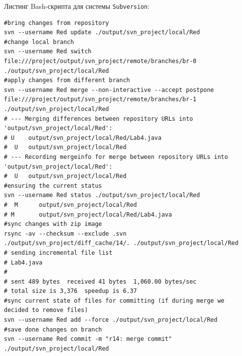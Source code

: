Листинг Bash-скрипта для системы \texttt{Subversion}:
\begin{lstlisting}
#bring changes from repository
svn --username Red update ./output/svn_project/local/Red
#change local branch
svn --username Red switch file:///project/output/svn_project/remote/branches/br-0 ./output/svn_project/local/Red
#apply changes from different branch
svn --username Red merge --non-interactive --accept postpone file:///project/output/svn_project/remote/branches/br-1 ./output/svn_project/local/Red
# --- Merging differences between repository URLs into 'output/svn_project/local/Red':
# U    output/svn_project/local/Red/Lab4.java
#  U   output/svn_project/local/Red
# --- Recording mergeinfo for merge between repository URLs into 'output/svn_project/local/Red':
#  U   output/svn_project/local/Red
#ensuring the current status
svn --username Red status ./output/svn_project/local/Red
#  M      output/svn_project/local/Red
# M       output/svn_project/local/Red/Lab4.java
#sync changes with zip image
rsync -av --checksum --exclude .svn ./output/svn_project/diff_cache/14/. ./output/svn_project/local/Red
# sending incremental file list
# Lab4.java
# 
# sent 489 bytes  received 41 bytes  1,060.00 bytes/sec
# total size is 3,376  speedup is 6.37
#sync current state of files for committing (if during merge we decided to remove files)
svn --username Red add --force ./output/svn_project/local/Red
#save done changes on branch
svn --username Red commit -m "r14: merge commit" ./output/svn_project/local/Red
\end{lstlisting}

